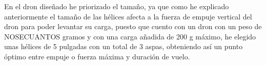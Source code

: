  
 En el dron diseñado he priorizado el tamaño, ya que como he explicado anteriormente el tamaño de las hélices afecta a la fuerza de empuje vertical del dron para poder levantar su carga, puesto que cuento con un dron con un peso de NOSECUANTOS gramos y con una carga añadida de 200 g máximo, he elegido unas hélices de 5 pulgadas con un total de 3 aspas, obteniendo así un punto óptimo entre empuje o fuerza máxima y duración de vuelo.

